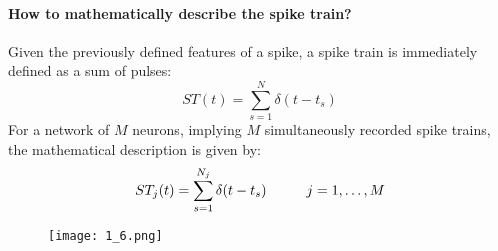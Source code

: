 \paragraph{How to mathematically describe the spike train?} Given the
previously defined features of a spike, a spike train is immediately
defined as a sum of pulses:
\begin{equation*}
      ST(t) = \sum_{s=1}^N\delta(t-t_s)
\end{equation*}
For a network of \(M\) neurons, implying \(M\) simultaneously recorded
spike trains, the mathematical description is given by:
\begin{equation*}
      ST_j(t) = \sum_{s=1}^{N_j}\delta(t-t_s) \hspace{1 cm} j=1,\dots,M
\end{equation*}
\begin{figure}[h]
      \centering
      \texttt{[image: 1\_6.png]}
\end{figure}
\newpage
